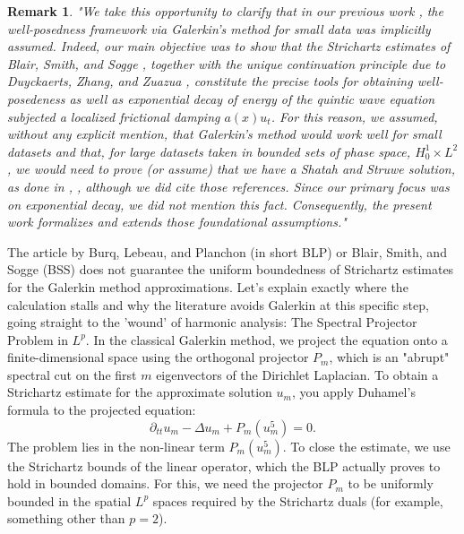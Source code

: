\documentclass[11pt,letterpaper]{amsart}
\newtheorem{remark}[theorem]{Remark}
\begin{document}
\begin{remark}
"We take this opportunity to clarify that in our previous work \cite{Cavalcanti2024}, the well-posedness framework via Galerkin's method for small data was implicitly assumed. Indeed, our main objective was to show that the Strichartz estimates of Blair, Smith, and Sogge \cite{BlairSmithSogge2009}, together with the unique continuation principle due to Duyckaerts, Zhang, and Zuazua \cite{Duyckaerts}, constitute the precise tools for obtaining well-posedeness as well as exponential decay of energy of the quintic wave equation subjected a localized frictional damping $a(x) u_t$. For this reason, we assumed, without any explicit mention, that Galerkin's method would work well for small datasets and that, for large datasets taken in bounded sets of phase space, $H_0^1\times L^2$, we would need to prove (or assume) that we have a Shatah and Struwe solution, as done in \cite{Kalantarov}, \cite{Laurent}, although we did cite those references. Since our primary focus was on exponential decay, we did not mention this fact. Consequently, the present work formalizes and extends those foundational assumptions."
\end{remark}

The article by Burq, Lebeau, and Planchon (in short BLP) \cite{BurqLebeauPlanchon} or Blair, Smith, and Sogge (BSS) \cite{BlairSmithSogge2009} does not guarantee the uniform boundedness of Strichartz estimates for the Galerkin method approximations. Let's explain exactly where the calculation stalls and why the literature avoids Galerkin at this specific step, going straight to the 'wound' of harmonic analysis: The Spectral Projector Problem in $L^p$. In the classical Galerkin method, we project the equation onto a finite-dimensional space using the orthogonal projector $P_m$, which is an "abrupt" spectral cut on the first $m$ eigenvectors of the Dirichlet Laplacian. To obtain a Strichartz estimate for the approximate solution $u_m$, you apply Duhamel's formula to the projected equation: $$\partial_{tt} u_m - \Delta u_m + P_m(u_m^5) = 0.$$ The problem lies in the non-linear term $P_m( u_m^5)$. To close the estimate, we use the Strichartz bounds of the linear operator, which the BLP actually proves to hold in bounded domains. For this, we need the projector $P_m$ to be uniformly bounded in the spatial $L^p$ spaces required by the Strichartz duals (for example, something other than $p=2$).
\end{document}
